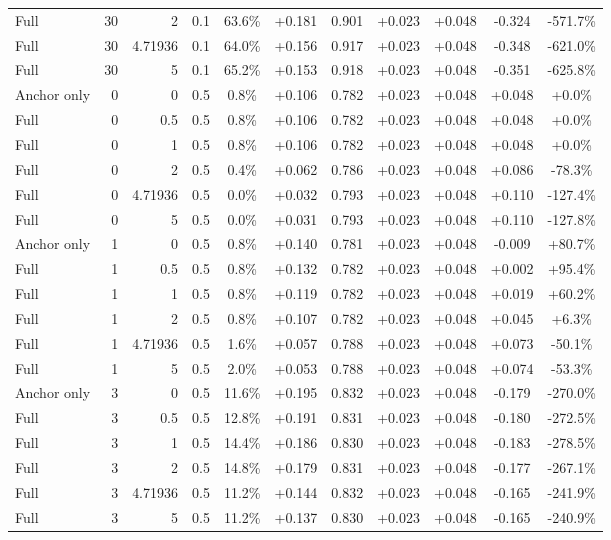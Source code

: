 \begin{table}[htbp]
\begin{tabular}{lrrrccccccc}
Full & 30 & 2 & 0.1 & 63.6\% & +0.181 & 0.901 & +0.023 & +0.048 & -0.324 & -571.7\% \\
Full & 30 & 4.71936 & 0.1 & 64.0\% & +0.156 & 0.917 & +0.023 & +0.048 & -0.348 & -621.0\% \\
Full & 30 & 5 & 0.1 & 65.2\% & +0.153 & 0.918 & +0.023 & +0.048 & -0.351 & -625.8\% \\
Anchor only & 0 & 0 & 0.5 & 0.8\% & +0.106 & 0.782 & +0.023 & +0.048 & +0.048 & +0.0\% \\
Full & 0 & 0.5 & 0.5 & 0.8\% & +0.106 & 0.782 & +0.023 & +0.048 & +0.048 & +0.0\% \\
Full & 0 & 1 & 0.5 & 0.8\% & +0.106 & 0.782 & +0.023 & +0.048 & +0.048 & +0.0\% \\
Full & 0 & 2 & 0.5 & 0.4\% & +0.062 & 0.786 & +0.023 & +0.048 & +0.086 & -78.3\% \\
Full & 0 & 4.71936 & 0.5 & 0.0\% & +0.032 & 0.793 & +0.023 & +0.048 & +0.110 & -127.4\% \\
Full & 0 & 5 & 0.5 & 0.0\% & +0.031 & 0.793 & +0.023 & +0.048 & +0.110 & -127.8\% \\
Anchor only & 1 & 0 & 0.5 & 0.8\% & +0.140 & 0.781 & +0.023 & +0.048 & -0.009 & +80.7\% \\
Full & 1 & 0.5 & 0.5 & 0.8\% & +0.132 & 0.782 & +0.023 & +0.048 & +0.002 & +95.4\% \\
Full & 1 & 1 & 0.5 & 0.8\% & +0.119 & 0.782 & +0.023 & +0.048 & +0.019 & +60.2\% \\
Full & 1 & 2 & 0.5 & 0.8\% & +0.107 & 0.782 & +0.023 & +0.048 & +0.045 & +6.3\% \\
Full & 1 & 4.71936 & 0.5 & 1.6\% & +0.057 & 0.788 & +0.023 & +0.048 & +0.073 & -50.1\% \\
Full & 1 & 5 & 0.5 & 2.0\% & +0.053 & 0.788 & +0.023 & +0.048 & +0.074 & -53.3\% \\
Anchor only & 3 & 0 & 0.5 & 11.6\% & +0.195 & 0.832 & +0.023 & +0.048 & -0.179 & -270.0\% \\
Full & 3 & 0.5 & 0.5 & 12.8\% & +0.191 & 0.831 & +0.023 & +0.048 & -0.180 & -272.5\% \\
Full & 3 & 1 & 0.5 & 14.4\% & +0.186 & 0.830 & +0.023 & +0.048 & -0.183 & -278.5\% \\
Full & 3 & 2 & 0.5 & 14.8\% & +0.179 & 0.831 & +0.023 & +0.048 & -0.177 & -267.1\% \\
Full & 3 & 4.71936 & 0.5 & 11.2\% & +0.144 & 0.832 & +0.023 & +0.048 & -0.165 & -241.9\% \\
Full & 3 & 5 & 0.5 & 11.2\% & +0.137 & 0.830 & +0.023 & +0.048 & -0.165 & -240.9\% \\

\end{tabular}
\end{table}
